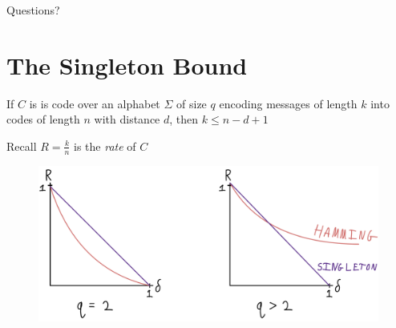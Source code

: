 \documentclass[aspectratio=169]{beamer}
\begin{document}
\begin{frame}{}
      \begin{center}
    {\color{sigma@mainblue} \LARGE Questions?}
  \end{center}
\end{frame}

\section{The Singleton Bound}
\frame{\sectionpage}

\begin{frame}
    \begin{thrm}
        If $C$ is is code over an alphabet $\Sigma$ of size $q$ encoding messages of length $k$ into codes of length $n$ with distance $d$, then $k \leq n - d + 1$
    \end{thrm}
    Recall $R = \frac{k}{n}$ is the \emph{rate} of $C$
    \begin{figure}
        \centering
        \includegraphics[width=\textwidth]{single.png}
    \end{figure}
\end{frame}
\end{document}
